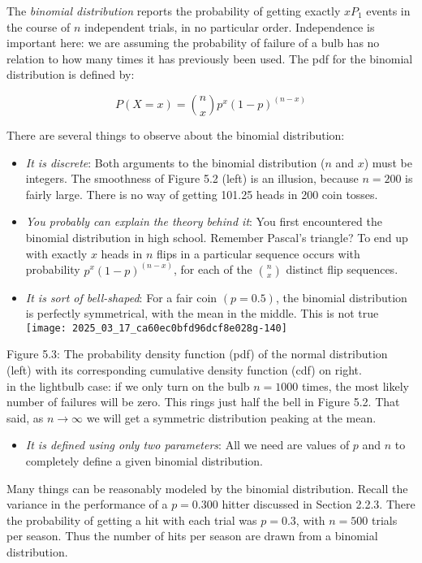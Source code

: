 \documentclass[10pt]{article}
\begin{document}
The \emph{binomial distribution} reports the probability of getting exactly $x P_{1}$ events in the course of $n$ independent trials, in no particular order. Independence is important here: we are assuming the probability of failure of a bulb has no relation to how many times it has previously been used. The pdf for the binomial distribution is defined by:

\[
P(X=x)=\binom{n}{x} p^{x}(1-p)^{(n-x)}
\]

There are several things to observe about the binomial distribution:
\begin{itemize}
  \item \emph{It is discrete}: Both arguments to the binomial distribution ($n$ and $x$) must be integers. The smoothness of Figure 5.2 (left) is an illusion, because $n=200$ is fairly large. There is no way of getting 101.25 heads in 200 coin tosses.
  \item \emph{You probably can explain the theory behind it}: You first encountered the binomial distribution in high school. Remember Pascal's triangle? To end up with exactly $x$ heads in $n$ flips in a particular sequence occurs with probability $p^{x}(1-p)^{(n-x)}$, for each of the $\binom{n}{x}$ distinct flip sequences.
  \item \emph{It is sort of bell-shaped}: For a fair coin $(p=0.5)$, the binomial distribution is perfectly symmetrical, with the mean in the middle. This is not true\\
\texttt{[image: 2025\_03\_17\_ca60ec0bfd96dcf8e028g-140]}
\end{itemize}

Figure 5.3: The probability density function (pdf) of the normal distribution (left) with its corresponding cumulative density function (cdf) on right.\\
in the lightbulb case: if we only turn on the bulb $n=1000$ times, the most likely number of failures will be zero. This rings just half the bell in Figure 5.2. That said, as $n \rightarrow \infty$ we will get a symmetric distribution peaking at the mean.

\begin{itemize}
  \item \emph{It is defined using only two parameters}: All we need are values of $p$ and $n$ to completely define a given binomial distribution.
\end{itemize}

Many things can be reasonably modeled by the binomial distribution. Recall the variance in the performance of a $p=0.300$ hitter discussed in Section 2.2.3. There the probability of getting a hit with each trial was $p=0.3$, with $n=500$ trials per season. Thus the number of hits per season are drawn from a binomial distribution.
\end{document}
